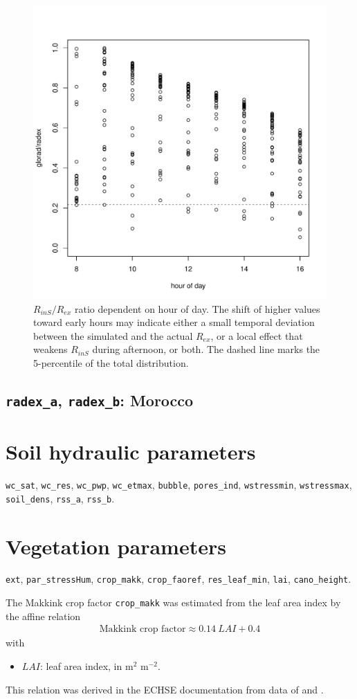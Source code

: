 \documentclass{scrreprt}
\begin{document}
\begin{figure}[ht]
  \centering
  \includegraphics[width=0.6\hsize]{./plot_radex2.pdf}
  \caption{$R_{inS}/R_{ex}$ ratio dependent on hour of day.
           The shift of higher values toward early hours may indicate either a small temporal deviation between the simulated and the actual $R_{ex}$, or a local effect that weakens $R_{inS}$ during afternoon, or both.
           The dashed line marks the 5-percentile of the total distribution.}
  \label{fig:portugal_radex2}
\end{figure}

\subsection{\texttt{radex\_a}, \texttt{radex\_b}: Morocco} \label{ssec:parest_rad_radexmorocco}

\section{Soil hydraulic parameters} \label{sec:parest_soil}

\verb!wc_sat!, \verb!wc_res!, \verb!wc_pwp!, \verb!wc_etmax!, \verb!bubble!, \verb!pores_ind!, \verb!wstressmin!, \verb!wstressmax!, \verb!soil_dens!, \verb!rss_a!, \verb!rss_b!.

\section{Vegetation parameters} \label{sec:parest_veg}

\verb!ext!, \verb!par_stressHum!, \verb!crop_makk!, \verb!crop_faoref!, \verb!res_leaf_min!, \verb!lai!, \verb!cano_height!.

The Makkink crop factor \verb!crop_makk! was estimated from the leaf area index by the affine relation
\begin{align} \label{eq:cropmakk}
  \text{Makkink~crop~factor} \approx 0.14 ~ LAI + 0.4
\end{align}
%
with
\begin{itemize}
  \item[] $LAI$: leaf area index, in m$^2$ m$^{-2}$.
\end{itemize}
%
This relation was derived in the ECHSE documentation from data of \citet{feddes87} and \citet{ludwig06}.
\end{document}
